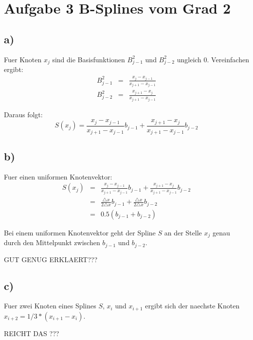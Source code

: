
\section*{Aufgabe 3 B-Splines vom Grad 2}

\subsection*{a)}
Fuer Knoten $x_j$ sind die Basisfunktionen $B^2_{j-1}$ und $B^2_{j-2}$ ungleich $0$. Vereinfachen ergibt:
\begin{eqnarray}
    B^2_{j-1}&=& \frac{x_j - x_{j-1}}{x_{j+1} - x_{j-1}} \\
    B^2_{j-2}&=& \frac{x_{j+1} - x_{j}}{x_{j+1} - x_{j-1}}
\end{eqnarray}

Daraus folgt: 
\begin{equation}
    S(x_j) = \frac{x_j - x_{j-1}}{x_{j+1} - x_{j-1}} b_{j-1} +  \frac{x_{j+1} - x_{j}}{x_{j+1} - x_{j-1}} b_{j-2}
\end{equation}



\subsection*{b)}

Fuer einen uniformen Knotenvektor:
\begin{eqnarray}
    S(x_j) &=& \frac{x_j - x_{j-1}}{x_{j+1} - x_{j-1}} b_{j-1} +  \frac{x_{j+1} - x_{j}}{x_{j+1} - x_{j-1}} b_{j-2} \\
     &=& \frac{\triangle x}{2 \triangle x} b_{j-1} +  \frac{\triangle x}{2 \triangle x} b_{j-2} \\
      &=& 0.5 ( b_{j-1} + b_{j-2}) 
\end{eqnarray}

Bei einem uniformen Knotenvektor geht der Spline $S$ an der Stelle $x_j$ genau durch den Mittelpunkt zwischen $b_{j-1}$ und  $b_{j-2}$.

GUT GENUG ERKLAERT???


\subsection{c)}

Fuer zwei Knoten eines Splines $S$, $x_i$ und $x_{i+1}$ ergibt sich der  naechste Knoten $x_{i+2} = 1/3 *( x_{i+1}- x_i)$.

REICHT DAS ??? 
